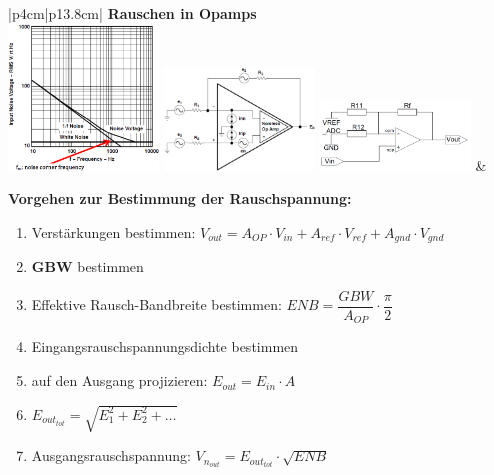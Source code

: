 \vspace{-2.5\topsep}
\begin{longtable}[t]{|p{4cm}|p{13.8cm}|}
    \hline  
    \textbf{ Rauschen in Opamps}
    \\ \hdashline
    \includegraphics[width=4cm, valign=t]{pictures/NoiseCornerFreq.png}\newline \vspace{0.5cm}\newline
    \includegraphics[width=4cm]{pictures/oampnoise.png} \newline \vspace{0.5cm} \newline
    \includegraphics[width=4cm]{pictures/RauschenSummierer}
    &{\textbf{Vorgehen zur Bestimmung der Rauschspannung:}
    \begin{enumerate}
      \setlength{\itemsep}{4pt}
      \item  Verstärkungen bestimmen: \newline
             $\boxed{V_{out} = A_{OP} \cdot V_{in} + A_{ref} \cdot V_{ref} + A_{gnd} \cdot V_{gnd}}$
      \item  \textbf{GBW} bestimmen
      \item  Effektive Rausch-Bandbreite bestimmen: \newline $\boxed{ENB = \dfrac{GBW}{A_{OP}} \cdot \dfrac{\pi}{2}} $
      \item  Eingangsrauschspannungsdichte bestimmen
      \item  auf den Ausgang projizieren: $\boxed{E_{out} = E_{in} \cdot A}$ 
      \item  $\boxed{E_{out_{tot}} = \sqrt{E_1^2 + E_2^2 + \ldots}}$
      \item  Ausgangsrauschspannung: $\boxed{V_{n_{out}} = E_{out_{tot}} \cdot \sqrt{ENB}}$
    \end{enumerate}

}
\end{longtable}
